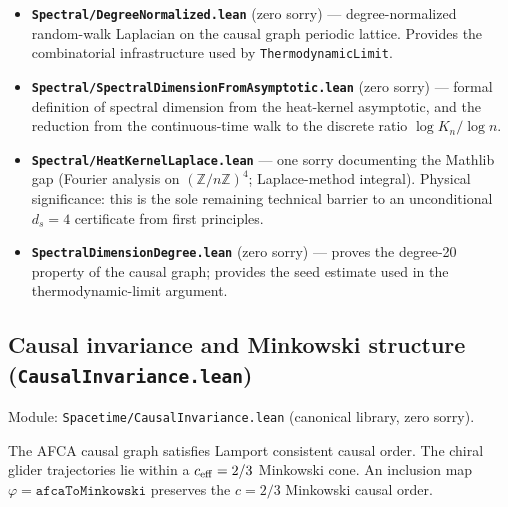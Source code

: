 \documentclass[11pt,a4paper]{article}
\newenvironment{keybox}[1]{%
  \Needspace*{8\baselineskip}%
  \begin{tcolorbox}[
    enhanced,
    breakable=false,
    colback=blue!5,
    colframe=blue!45!black,
    coltitle=black,
    colbacktitle=blue!14,
    boxrule=0.85pt,
    arc=2.5pt,
    left=9pt, right=9pt, top=6pt, bottom=6pt,
    titlerule=0.55pt,
    fonttitle=\bfseries,
    title={#1},
    before upper=\raggedright,
    before skip=0.9\baselineskip,
    after skip=0.9\baselineskip
  ]%
}{%
  \end{tcolorbox}%
}
\theoremstyle{definition}
\begin{document}
\begin{itemize}[nosep]
\item \textbf{\texttt{Spectral/DegreeNormalized.lean}} (zero sorry) —
  degree-normalized random-walk Laplacian on the causal graph periodic lattice.
  Provides the combinatorial infrastructure used by \texttt{ThermodynamicLimit}.
\item \textbf{\texttt{Spectral/SpectralDimensionFromAsymptotic.lean}} (zero sorry) —
  formal definition of spectral dimension from the heat-kernel asymptotic,
  and the reduction from the continuous-time walk to the discrete ratio
  $\log K_n / \log n$.
\item \textbf{\texttt{Spectral/HeatKernelLaplace.lean}} — one sorry documenting
  the Mathlib gap (Fourier analysis on $(\mathbb{Z}/n\mathbb{Z})^4$;
  Laplace-method integral).  Physical significance: this is the sole
  remaining technical barrier to an unconditional $d_s = 4$ certificate
  from first principles.
\item \textbf{\texttt{SpectralDimensionDegree.lean}} (zero sorry) —
  proves the degree-20 property of the causal graph; provides the
  seed estimate used in the thermodynamic-limit argument.
\end{itemize}

\subsection{Causal invariance and Minkowski structure
  (\texttt{CausalInvariance.lean})}\label{subsec:causal-invariance}

Module: \texttt{Spacetime/CausalInvariance.lean} (canonical library, zero sorry).

\begin{keybox}{SR from causal structure}
The AFCA causal graph satisfies Lamport consistent causal order.
The chiral glider trajectories lie within a $c_{\rm eff} = 2/3$
Minkowski cone.  An inclusion map $\varphi = \texttt{afcaToMinkowski}$
preserves the $c = 2/3$ Minkowski causal order.
\end{keybox}
\end{document}
